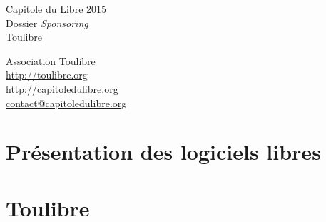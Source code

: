 \documentclass{cdl_sponsor}
\begin{document}
\thispagestyle{empty} %


\colorbox{Cdl}{
	\parbox[t]{1.0\linewidth}{
		\centering \fontsize{50pt}{80pt}\selectfont %
		\vspace*{0.7cm} %
		
		\hfill Capitole du Libre 2015		\\
		\hfill Dossier \textit{Sponsoring}  \\
		\hfill Toulibre  					\\\par
		
		\vspace*{0.7cm} %
	}
}


\vfill %

{\centering \large 
\hfill Association Toulibre \\
\hfill \url{http://toulibre.org} \\
\hfill \url{http://capitoledulibre.org} \\
\hfill \url{contact@capitoledulibre.org} \\
}
\clearpage

\section{Présentation des logiciels libres}

	

\section{Toulibre}
\end{document}
